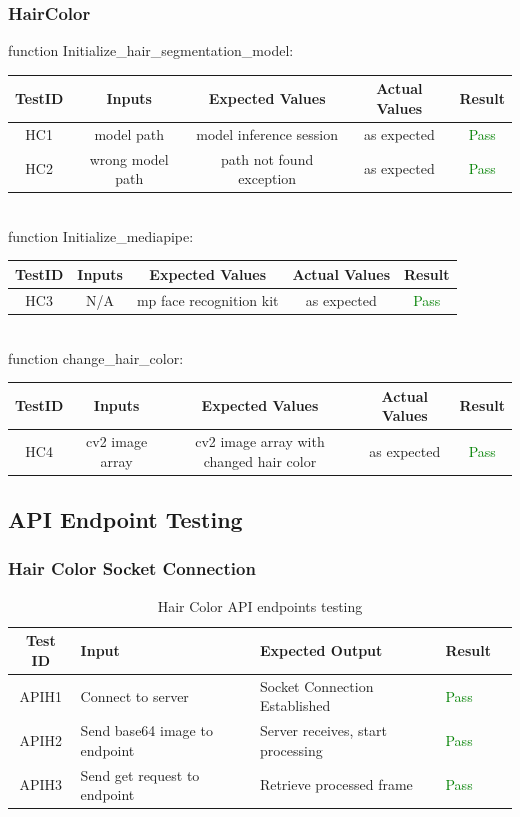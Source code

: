 \documentclass[12pt, titlepage]{article}
\begin{document}
\subsubsection{HairColor}
function Initialize\_hair\_segmentation\_model:\\
\newline
\begin{tabular}{ |c|c|c|c|c| } 
 \hline
 TestID & Inputs & Expected Values & Actual Values & Result \\ 
 \hline
HC1 & model path & model inference session & as expected & \textcolor{green}{Pass} \\
HC2 & wrong model path & path not found exception & as expected & \textcolor{green}{Pass} \\
 \hline
\end{tabular}
\\
\newline
function Initialize\_mediapipe:\\
\newline
\begin{tabular}{ |c|c|c|c|c| } 
 \hline
 TestID & Inputs & Expected Values & Actual Values & Result \\ 
 \hline
HC3 & N/A & mp face recognition kit & as expected & \textcolor{green}{Pass} \\
 \hline
\end{tabular}
\\
\newline
function change\_hair\_color:\\
\newline
\begin{tabular}{ |c|c|c|c|c| } 
 \hline
 TestID & Inputs & Expected Values & Actual Values & Result \\ 
 \hline
HC4 & cv2 image array & cv2 image array with changed hair color & as expected & \textcolor{green}{Pass} \\
 \hline
\end{tabular}
\newpage
\subsection{API Endpoint Testing}
\subsubsection{Hair Color Socket Connection}
\begin{table}[ht!]
    \centering
    \begin{tabular}{|c|p{}|p{}|p{}|c|}
    \hline
        \textbf{Test ID} & \textbf{Input} & \textbf{Expected Output} & \textbf{Result} \\ \hline
        APIH1 & Connect to server & Socket Connection Established & \textcolor{green}{Pass} \\ \hline
        APIH2 & Send base64 image to endpoint & Server receives, start processing & \textcolor{green}{Pass} \\ \hline
        APIH3 & Send get request to endpoint & Retrieve processed frame & \textcolor{green}{Pass} \\ \hline
    \end{tabular}
    \caption{Hair Color API endpoints testing}
\end{table}
\end{document}
